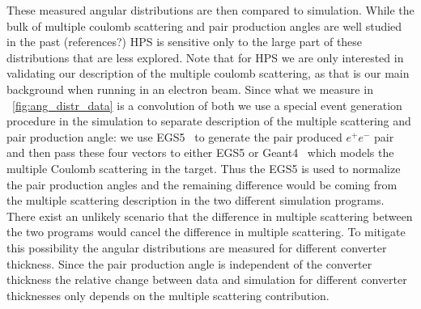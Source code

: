 These measured angular distributions are then compared to simulation. 
While the bulk of multiple coulomb scattering and pair production angles 
are well studied in the past {\color{red} (references?)} HPS 
is sensitive only to the large part of these distributions that are less explored. 
Note that for HPS we are only interested in validating our description of the multiple coulomb scattering, as that 
is our main background when running in an electron beam. Since 
what we measure in ~\ref{fig:ang_distr_data} is a convolution of both we use a special event 
generation procedure in the simulation to separate description of the multiple scattering and 
pair production angle: we use EGS5~\cite{egs5} to generate the pair produced $e^+e^-$ pair 
and then pass these four vectors to either {\sc EGS5} or {\sc Geant4}~\cite{geant4} which 
models the multiple Coulomb scattering in the target. Thus the {\sc EGS5} is used to normalize 
the pair production angles and the remaining difference would be coming from the 
multiple scattering description in the two different simulation programs. There exist an unlikely 
scenario that the difference in multiple scattering between the two programs would cancel the difference in multiple scattering. To mitigate this possibility the angular distributions are 
measured for different converter thickness. Since the pair production angle is independent of 
the converter thickness the relative change between data and simulation for different converter thicknesses only depends on the multiple scattering contribution. 

